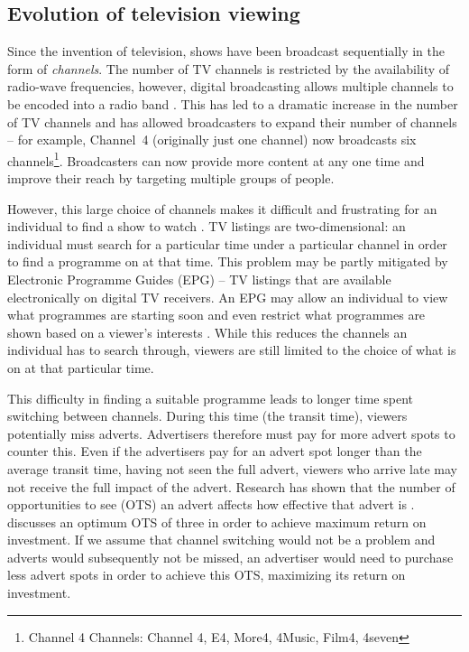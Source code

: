 \subsection{Evolution of television viewing}
	
	Since the invention of television, shows have been broadcast sequentially in the form of \textit{channels}. The number of TV channels is restricted by the availability of radio-wave frequencies, however, digital broadcasting allows multiple channels to be encoded into a radio band \citep{DTVTransmission}. This has led to a dramatic increase in the number of TV channels and has allowed broadcasters to expand their number of channels -- for example, Channel~4 (originally just one channel) now broadcasts six channels\footnote{Channel 4 Channels: Channel 4, E4, More4, 4Music, Film4, 4seven}. Broadcasters can now provide more content at any one time and improve their reach by targeting multiple groups of people.

	However, this large choice of channels makes it difficult and frustrating for an individual to find a show to watch \citep{cisco10Reasons}. TV listings are two-dimensional: an individual must search for a particular time under a particular channel in order to find a programme on at that time. This problem may be partly mitigated by Electronic Programme Guides (EPG) -- TV listings that are available electronically on digital TV receivers. An EPG may allow an individual to view what programmes are starting soon and even restrict what programmes are shown based on a viewer's interests \citep{informationOverload}. While this reduces the channels an individual has to search through, viewers are still limited to the choice of what is on at that particular time.

	This difficulty in finding a suitable programme leads to longer time spent switching between channels. During this time (the transit time), viewers potentially miss adverts. Advertisers therefore must pay for more advert spots to counter this. Even if the advertisers pay for an advert spot longer than the average transit time, having not seen the full advert, viewers who arrive late may not receive the full impact of the advert. Research has shown that the number of opportunities to see (OTS) an advert affects how effective that advert is \citep{OTS}. \citeauthor{OTS} discusses an optimum OTS of three in order to achieve maximum return on investment. If we assume that channel switching would not be a problem and adverts would subsequently not be missed, an advertiser would need to purchase less advert spots in order to achieve this OTS, maximizing its return on investment.

